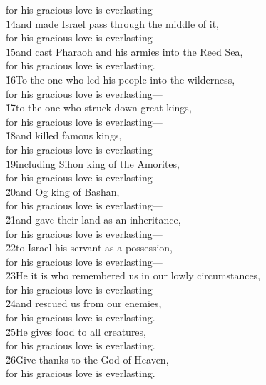 \begin{poetry}
\poemll    for his gracious love is everlasting--- \\
\poeml \v{14}and made Israel pass through the middle of it, \\
\poemll    for his gracious love is everlasting--- \\
\poeml \v{15}and cast Pharaoh and his armies into the Reed Sea, \\
\poemll    for his gracious love is everlasting. \\
\poeml \v{16}To the one who led his people into the wilderness, \\
\poemll    for his gracious love is everlasting--- \\
\poeml \v{17}to the one who struck down great kings, \\
\poemll    for his gracious love is everlasting--- \\
\poeml \v{18}and killed famous kings, \\
\poemll    for his gracious love is everlasting--- \\
\poeml \v{19}including Sihon king of the Amorites, \\
\poemll    for his gracious love is everlasting--- \\
\poeml \v{20}and Og king of Bashan, \\
\poemll    for his gracious love is everlasting--- \\
\poeml \v{21}and gave their land as an inheritance, \\
\poemll    for his gracious love is everlasting--- \\
\poeml \v{22}to Israel his servant as a possession, \\
\poemll    for his gracious love is everlasting--- \\
\poeml \v{23}He it is who remembered us in our lowly circumstances, \\
\poemll    for his gracious love is everlasting--- \\
\poeml \v{24}and rescued us from our enemies, \\
\poemll    for his gracious love is everlasting. \\
\poeml \v{25}He gives food to all creatures, \\
\poemll    for his gracious love is everlasting. \\
\poeml \v{26}Give thanks to the God of Heaven, \\
\poemll    for his gracious love is everlasting.
\end{poetry}

